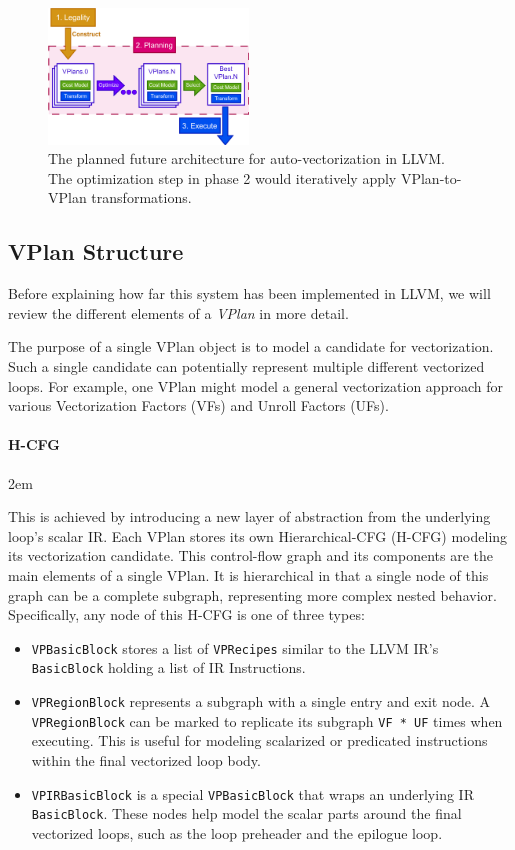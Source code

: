 \documentclass[sigplan,11pt,nonacm]{acmart}
\begin{document}
\begin{figure}
  \centering
  \includegraphics[width=0.475\textwidth]{images/vplan-future.png}
  \caption{The planned future architecture for auto-vectorization in LLVM. The 
  optimization step in phase 2 would iteratively apply VPlan-to-VPlan transformations.}
  \label{fig:vplan-future}
\end{figure}

\subsection{VPlan Structure}
Before explaining how far this system has been implemented in LLVM, we will review
the different elements of a \textit{VPlan} in more detail.

The purpose of a single VPlan object is to model a candidate for vectorization. 
Such a single candidate can potentially represent multiple different vectorized loops. 
For example, one VPlan might model a general vectorization approach for various 
Vectorization Factors (VFs) and Unroll Factors (UFs).

\paragraph{H-CFG}
\emergencystretch 2em

This is achieved by introducing a new layer of abstraction from the underlying loop's scalar IR.
Each VPlan stores its own Hierarchical-CFG (H-CFG) modeling its vectorization candidate. This 
control-flow graph and its components are the main elements of a single VPlan. It is hierarchical
in that a single node of this graph can be a complete subgraph, representing more complex nested
behavior.
Specifically, any node of this H-CFG is one of three types:

\begin{itemize}
  \item \texttt{VPBasicBlock} stores a list of \texttt{VPRecipes} similar to 
  the LLVM IR's \texttt{BasicBlock} holding a list of IR Instructions.
  \item \texttt{VPRegionBlock} represents a subgraph with a single entry and exit node. 
  A \texttt{VPRegionBlock} can be marked to replicate its subgraph
  \texttt{VF~*~UF} times when executing. This is useful for modeling scalarized or predicated
  instructions within the final vectorized loop body.
  \item \texttt{VPIRBasicBlock} is a special \texttt{VPBasicBlock} that wraps an underlying
  IR \texttt{BasicBlock}. These nodes help model the scalar parts around the 
  final vectorized loops, such as the loop preheader and the epilogue loop.
\end{itemize}
\end{document}

